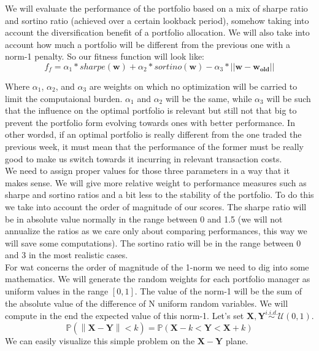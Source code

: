 We will evaluate the performance of the portfolio based on a mix of sharpe ratio and sortino ratio (achieved over a certain lookback period), somehow taking into account the diversification benefit of a portfolio allocation. We will also take into account how much a portfolio will be different from the previous one with a norm-1 penalty.
So our fitness function will look like:\\

$$
f_f = \alpha_1*sharpe(\mathbf{w}) + \alpha_2*sortino(\mathbf{w}) - \alpha_3*||\mathbf{w} - \mathbf{w_{old}}||
$$

Where $\alpha_1$, $\alpha_2$, and $\alpha_3$ are weights on which no optimization will be carried to limit the computaional burden. $\alpha_1$ and $\alpha_2$ will be the same, while $\alpha_3$ will be such that the influence on the optimal portfolio is relevant but still not that big to prevent the portfolio form evolving towards ones with better performance. In other wordsd, if an optimal portfolio is really different from the one traded the previous week, it must mean that the performance of the former must be really good to make us switch towards it incurring in relevant transaction costs.\\ 
We need to assign proper values for those three parameters in a way that it makes sense. We will give more relative weight to performance measures such as sharpe and sortino ratios and a bit less to the stability of the portfolio. To do this we take into account the order of magnitude of our scores. The sharpe ratio will be in absolute value normally in the range between 0 and 1.5 (we will not annualize the ratios as we care only about comparing performances, this way we will save some computations). The sortino ratio will be in the range between 0 and 3 in the most realistic cases.\\
For wat concerns the order of magnitude of the 1-norm we need to dig into some mathematics. We will generate the random weights for each portfolio manager as uniform values in the range $[0,1]$. The value of the norm-1 will be the sum of the absolute value of the difference of N uniform random variables. We will compute in the end the expected value of this norm-1. Let's set $\mathbf{X}, \mathbf{Y} \stackrel{i.i.d.}{\sim} \mathcal{U}(0,1)$.\\
\begin{equation} \label{first_step}
\mathbb{P}\left(\left\lVert\mathbf{X} - \mathbf{Y}\right\rVert < k\right) = \mathbb{P}\left(\mathbf{X} - k < \mathbf{Y} < \mathbf{X} + k\right)
\end{equation}  
We can easily visualize this simple problem on the $\mathbf{X}-\mathbf{Y}$ plane.\\


